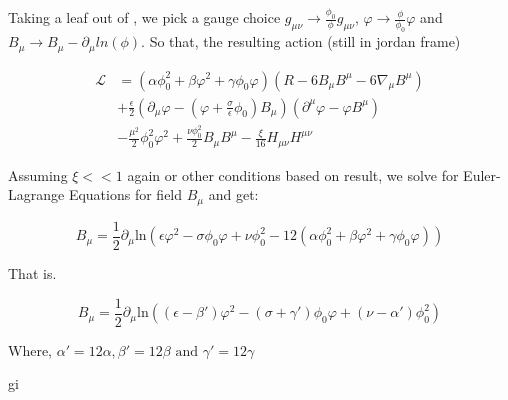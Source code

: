 \documentclass{article}
\begin{document}
Taking a leaf out of \cite{barker2024poincaregaugetheoryconformal}, we pick a gauge choice $g_{\mu \nu} \rightarrow \frac{\phi_0}{\phi} g_{\mu \nu}$, $\varphi \rightarrow \frac{\phi}{\phi_0} \varphi$ and $B_{\mu} \rightarrow B_{\mu} - \partial_{\mu} ln(\phi)$. So that, the resulting action (still in jordan frame)

\begin{equation}
    \begin{aligned}
        \mathcal{L} &= (\alpha \phi^2_0 + \beta \varphi^2 + \gamma \phi_0 \varphi) (R - 6B_{\mu} B^{\mu} - 6\nabla_\mu B^\mu) \\
        &+ \frac{\epsilon}{2} (\partial_\mu \varphi - (\varphi + \frac{\sigma}{\epsilon} \phi_0)B_\mu)(\partial^\mu \varphi - \varphi B^\mu)\\
        &- \frac{\mu^2}{2} \phi^2_0 \varphi^2 + \frac{\nu \phi_{0}^{2}}{2} B_\mu B^\mu - \frac{\xi}{16} H_{\mu\nu}H^{\mu\nu}
    \end{aligned}
\end{equation}

Assuming $\xi << 1$ again or other conditions based on result, we solve for Euler-Lagrange Equations for field $B_\mu$ and get:

\begin{equation}
    B_\mu = \frac{1}{2} \partial_\mu \text{ln}(\epsilon \varphi^2 - \sigma \phi_0 \varphi + \nu \phi^2_0 -12 (\alpha \phi^2_0 + \beta \varphi^2 + \gamma \phi_0 \varphi))
\end{equation}

That is.

\begin{equation}
    B_\mu = \frac{1}{2} \partial_\mu \text{ln}((\epsilon - \beta') \varphi^2 - (\sigma + \gamma') \phi_0 \varphi + (\nu - \alpha')\phi^2_0)
\end{equation}

Where, $\alpha' = 12\alpha, \beta' = 12\beta \text{ and } \gamma' = 12 \gamma$

gi


\newpage

\printbibliography
\end{document}
